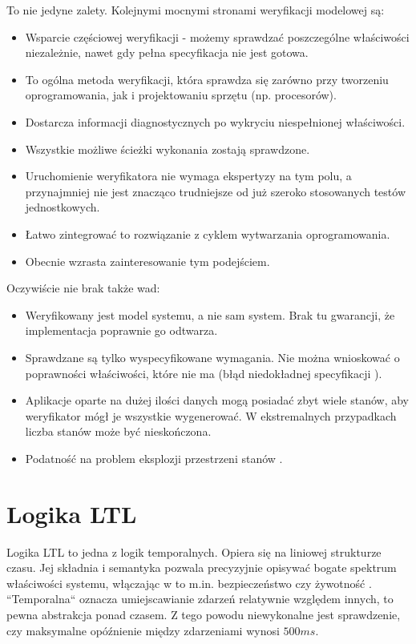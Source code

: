 \vspace{0.5cm}
\noindent
To nie jedyne zalety. Kolejnymi mocnymi stronami weryfikacji modelowej są:
\begin{itemize}
\item Wsparcie częściowej weryfikacji - możemy sprawdzać poszczególne właściwości niezależnie, nawet gdy pełna specyfikacja nie jest gotowa.
\item To ogólna metoda weryfikacji, która sprawdza się zarówno przy tworzeniu oprogramowania, jak i projektowaniu sprzętu (np. procesorów).
\item Dostarcza informacji diagnostycznych po wykryciu niespełnionej właściwości.
\item Wszystkie możliwe ścieżki wykonania zostają sprawdzone.
\item Uruchomienie weryfikatora nie wymaga ekspertyzy na tym polu, a przynajmniej nie jest znacząco trudniejsze od już szeroko stosowanych testów jednostkowych.
\item Łatwo zintegrować to rozwiązanie z cyklem wytwarzania oprogramowania.
\item Obecnie wzrasta zainteresowanie tym podejściem.
\end{itemize}

\vspace{0.5cm}
\noindent
Oczywiście nie brak także wad:
\begin{itemize}
\item Weryfikowany jest model systemu, a nie sam system. Brak tu gwarancji, że implementacja poprawnie go odtwarza.
\item Sprawdzane są tylko wyspecyfikowane wymagania. Nie można wnioskować o poprawności właściwości, które nie ma (błąd niedokładnej specyfikacji \cite{Lam05}).
\item Aplikacje oparte na dużej ilości danych mogą posiadać zbyt wiele stanów, aby weryfikator mógł je wszystkie wygenerować. W ekstremalnych przypadkach liczba stanów może być nieskończona.
\item Podatność na problem eksplozji przestrzeni stanów \cite{Cla11}.
\end{itemize}


\section{Logika LTL}

Logika LTL to jedna z logik temporalnych. Opiera się na liniowej strukturze czasu.
Jej składnia i semantyka pozwala precyzyjnie opisywać bogate spektrum właściwości systemu, włączając w to m.in. bezpieczeństwo czy żywotność \cite{Bel17}.
``Temporalna`` oznacza umiejscawianie zdarzeń relatywnie względem innych, to pewna abstrakcja ponad czasem.  Z tego powodu niewykonalne jest sprawdzenie, czy maksymalne opóźnienie między zdarzeniami wynosi $500ms$.

